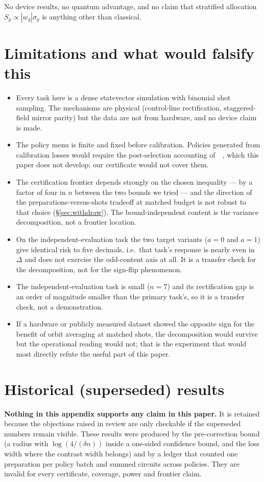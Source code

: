 \documentclass{article}
\providecommand{\citet}[1]{\citeauthor{#1}~\citep{#1}}
\begin{document}
No device results, no quantum advantage, and no claim that stratified allocation
$S_g\propto |w_g|\sigma_g$ is anything other than classical.

\section{Limitations and what would falsify this}

\begin{itemize}\itemsep2pt
\item Every task here is a dense statevector simulation with binomial shot sampling. The mechanisms
      are physical (control-line rectification, staggered-field mirror parity) but the data are not
      from hardware, and no device claim is made.
\item The policy menu is finite and fixed before calibration. Policies generated from calibration
      losses would require the post-selection accounting of~\citet{chen2026release}, which this paper
      does not develop; our certificate would not cover them.
\item The certification frontier depends strongly on the chosen inequality --- by a factor of four
      in $n$ between the two bounds we tried --- and the direction of the preparations-versus-shots
      tradeoff at matched budget is not robust to that choice (\S\ref{sec:withdraw}). The
      bound-independent content is the variance decomposition, not a frontier location.
\item On the independent-evaluation task the two target variants ($a=0$ and $a=1$) give identical
      risk to five decimals, i.e.\ that task's response is nearly even in $\Delta$ and does not
      exercise the odd-content axis at all. It is a transfer check for the decomposition, not for the
      sign-flip phenomenon.
\item The independent-evaluation task is small ($n=7$) and its rectification gap is an order of
      magnitude smaller than the primary task's, so it is a transfer check, not a demonstration.
\item If a hardware or publicly measured dataset showed the opposite sign for the benefit of orbit
      averaging at matched shots, the decomposition would survive but the operational reading would
      not; that is the experiment that would most directly refute the useful part of this paper.
\end{itemize}

\section*{Historical (superseded) results}
\label{sec:historical}
\textbf{Nothing in this appendix supports any claim in this paper.} It is retained because the
objections raised in review are only checkable if the superseded numbers remain visible. These
results were produced by the pre-correction bound (a radius with $\log(4/(\delta n))$ inside a
one-sided confidence bound, and the loss width where the contrast width belongs) and by a ledger
that counted one preparation per policy batch and summed circuits across policies. They are
invalid for every certificate, coverage, power and frontier claim.
\end{document}
